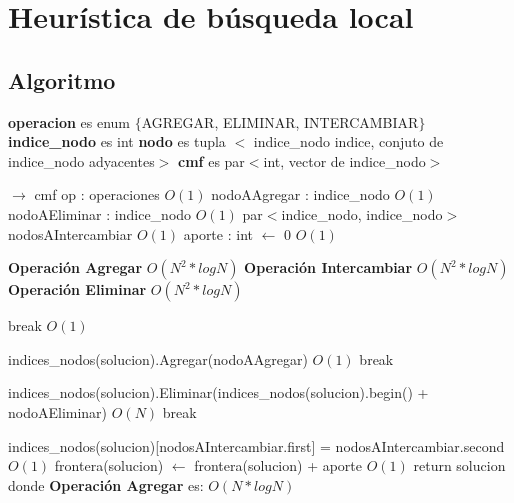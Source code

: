 \documentclass[a4paper, 10pt, twoside]{article}
\newenvironment{pseudo}[1][]{%
    \vspace{1em}%
    \begin{algorithmic}%
}
{%
    \end{algorithmic}%
    \vspace{1em}%
}
\newcommand{\Ode}[1]{\hfill $O(#1)$}
\begin{document}


\newpage

\section{Heurística de búsqueda local}
\subsection{Algoritmo}

\begin{pseudo}

\State \textbf{operacion} es enum $\lbrace$AGREGAR, ELIMINAR, INTERCAMBIAR$\rbrace$
\State \textbf{indice\_nodo} es int
\State \textbf{nodo} es tupla $<$ indice\_nodo indice, conjuto de indice\_nodo adyacentes$>$
\State \textbf{cmf} es par$<$int, vector de indice\_nodo$>$

\State
{} $\rightarrow$ cmf
		\State op : operaciones 																	\Ode{1}
		\State nodoAAgregar	: indice\_nodo 															\Ode{1}
		\State nodoAEliminar : indice\_nodo															\Ode{1}
		\State par$<$indice\_nodo, indice\_nodo$>$ nodosAIntercambiar								\Ode{1}
		\State aporte : int  $\leftarrow$ 0															\Ode{1}

		\State
		\State \textbf{Operación Agregar}															\Ode{N^2 * log N}
		\State
		\State \textbf{Operación Intercambiar}														\Ode{N^2 * log N}
		\State
		\State \textbf{Operación Eliminar}															\Ode{N^2 * log N}
		\State

		 break \EndIf																\Ode{1}

			    \State indices\_nodos(solucion).Agregar(nodoAAgregar)								\Ode{1}
			    \State break
		    \EndCase

			    \State indices\_nodos(solucion).Eliminar(indices\_nodos(solucion).begin() + nodoAEliminar)	\Ode{N}
			    \State break
		    \EndCase

			    \State indices\_nodos(solucion)[nodosAIntercambiar.first] = nodosAIntercambiar.second	\Ode{1}
		    \EndCase
		\EndSwitch
		\State
		\State frontera(solucion) $\leftarrow$ frontera(solucion) + aporte 							\Ode{1}
		\State return solucion
	\EndWhile
\EndProcedure
\State
\State donde \textbf{Operación Agregar} es:
\State
											\Ode{N*log N}


\end{pseudo}
\end{document}
